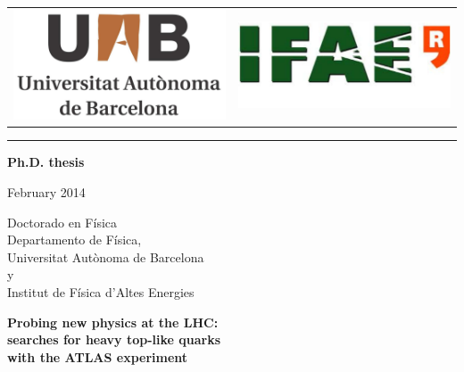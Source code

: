 \documentclass[titlepage]{article}
\begin{document}
\centering
\par
\vspace{6pt}
\begin{tabular}{p{5cm}p{5cm}}
\includegraphics[width=.23\textwidth]{uab_logo}&
\includegraphics[width=.3\textwidth]{ifae_logo}\\
\end{tabular}
\par
\vspace{6pt}
\hrule 
\par
\vspace{6pt}
\par
\begin{large}\textbf{Ph.D. thesis}\\
\par
\vspace{2pt}
\par
February 2014 \\ 
\par
\vspace{8pt}
\par
\end{large} 
\begin{Large}
Doctorado en Física\\
\vspace{-5pt}
Departamento de Física,\\
\vspace{-10pt}
Universitat Autònoma de Barcelona\\
\vspace{-10pt}
y\\
\vspace{-10pt}
Institut de F\'isica d'Altes Energies\\
\end{Large}
\vspace{80pt}
{\huge \bfseries Probing new physics at the LHC: } \\
\vspace{6pt}
{\huge \bfseries searches for heavy top-like quarks } \\
\vspace{6pt}
{\huge \bfseries with the ATLAS experiment}
\end{document}
